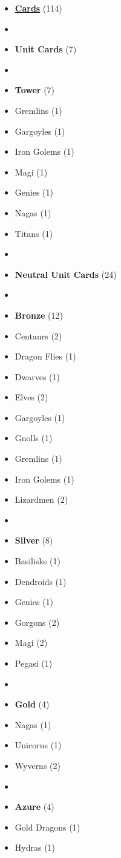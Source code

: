 \begin{multicols}{3}
\begin{itemize}[leftmargin=0pt, label={}, noitemsep]
  \item \textbf{\small{\underline{Cards}}} (114)
  \item
  \item \textbf{Unit Cards} (7)
  \item
  \item \textbf{Tower} (7)
  \item Gremlins (1)
  \item Gargoyles (1)
  \item Iron Golems (1)
  \item Magi (1)
  \item Genies (1)
  \item Nagas (1)
  \item Titans (1)
  \item
  \item \textbf{Neutral Unit Cards} (24)
  \item
  \item \textbf{Bronze} (12)
  \item Centaurs (2)
  \item Dragon Flies (1)
  \item Dwarves (1)
  \item Elves (2)
  \item Gargoyles (1)
  \item Gnolls (1)
  \item Gremlins (1)
  \item Iron Golems (1)
  \item Lizardmen (2)
  \item
  \item \textbf{Silver} (8)
  \item Basilisks (1)
  \item Dendroids (1)
  \item Genies (1)
  \item Gorgons (2)
  \item Magi (2)
  \item Pegasi (1)
  \item
  \item \textbf{Gold} (4)
  \item Nagas (1)
  \item Unicorns (1)
  \item Wyverns (2)
  \item
  \item \textbf{Azure} (4)
  \item Gold Dragons (1)
  \item Hydras (1)

\end{itemize}
\end{multicols}
